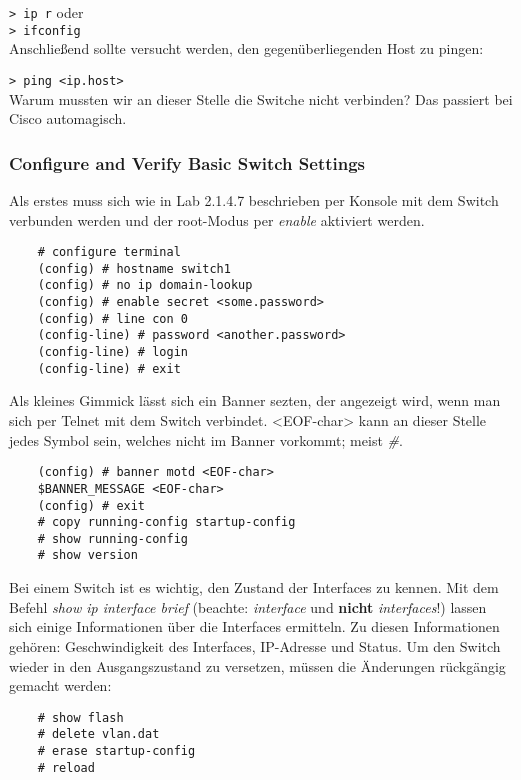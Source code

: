 \indent \verb+> ip r+ oder\\
\indent	\verb+> ifconfig+\\

\noindent Anschließend sollte versucht werden, den gegenüberliegenden Host zu pingen:

\indent	\verb+> ping <ip.host>+\\

\noindent Warum mussten wir an dieser Stelle die Switche nicht verbinden? Das passiert bei Cisco automagisch.

\subsubsection{Configure and Verify Basic Switch Settings}

Als erstes muss sich wie in Lab 2.1.4.7 beschrieben per Konsole mit dem Switch verbunden werden und der root-Modus per {\it enable} aktiviert werden.

\begin{lstlisting}
	# configure terminal
	(config) # hostname switch1
	(config) # no ip domain-lookup
	(config) # enable secret <some.password>
	(config) # line con 0
	(config-line) # password <another.password>
	(config-line) # login
	(config-line) # exit
\end{lstlisting}

\noindent Als kleines Gimmick lässt sich ein Banner sezten, der angezeigt wird, wenn man sich per Telnet mit dem Switch verbindet. <EOF-char> kann an dieser Stelle jedes Symbol sein, welches nicht im Banner vorkommt; meist {\it \#}.

\begin{lstlisting}
	(config) # banner motd <EOF-char>
	$BANNER_MESSAGE <EOF-char>
	(config) # exit
	# copy running-config startup-config
	# show running-config
	# show version
\end{lstlisting}

\noindent Bei einem Switch ist es wichtig, den Zustand der Interfaces zu kennen. Mit dem Befehl {\it show ip interface brief} (beachte: {\it interface} und {\bf nicht} {\it interfaces}!) lassen sich einige Informationen über die Interfaces ermitteln. Zu diesen Informationen gehören: Geschwindigkeit des Interfaces, IP-Adresse und Status. Um den Switch wieder in den Ausgangszustand zu versetzen, müssen die Änderungen rückgängig gemacht werden:

\begin{lstlisting}
	# show flash
	# delete vlan.dat
	# erase startup-config
	# reload
\end{lstlisting}

